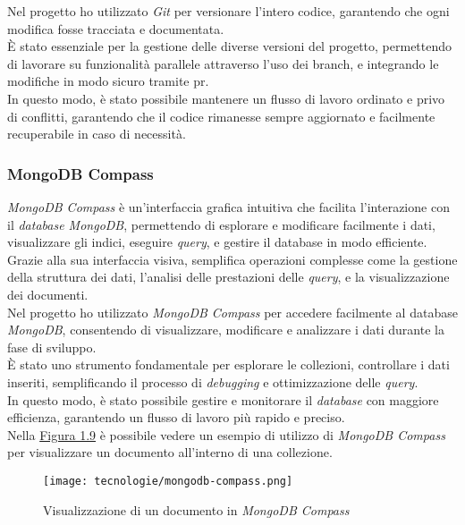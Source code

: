 \noindent Nel progetto ho utilizzato \textit{Git} per versionare l'intero codice, garantendo che ogni modifica fosse tracciata e documentata. \\
È stato essenziale per la gestione delle diverse versioni del progetto, permettendo di lavorare su funzionalità parallele attraverso l'uso dei \gls{branch}, e integrando le modifiche in modo sicuro tramite \gls{pr}. \\
In questo modo, è stato possibile mantenere un flusso di lavoro ordinato e privo di conflitti, garantendo che il codice rimanesse sempre aggiornato e facilmente recuperabile in caso di necessità. 

\subsubsection{MongoDB Compass}

\textit{MongoDB Compass} è un'interfaccia grafica intuitiva che facilita l'interazione con il \textit{database MongoDB}, permettendo di esplorare e modificare facilmente i dati, visualizzare gli indici, eseguire \textit{query}, e gestire il database in modo efficiente.\\
Grazie alla sua interfaccia visiva, semplifica operazioni complesse come la gestione della struttura dei dati, l'analisi delle prestazioni delle \textit{query}, e la visualizzazione dei documenti.\\

\noindent Nel progetto ho utilizzato \textit{MongoDB Compass}  per accedere facilmente al database \textit{MongoDB}, consentendo di visualizzare, modificare e analizzare i dati durante la fase di sviluppo.\\
È stato uno strumento fondamentale per esplorare le collezioni, controllare i dati inseriti, semplificando il processo di \textit{debugging} e ottimizzazione delle \textit{query}.\\
In questo modo, è stato possibile gestire e monitorare il \textit{database} con maggiore efficienza, garantendo un flusso di lavoro più rapido e preciso.\\

\noindent Nella {\hyperref[fig:mongodb-compass]{Figura 1.9}} è possibile vedere un esempio di utilizzo di \textit{MongoDB Compass} per visualizzare un documento all'interno di una collezione.

\begin{figure}[H]
    \label{fig:mongodb-compass}
    \centering
    \texttt{[image: tecnologie/mongodb-compass.png]}
    \caption{Visualizzazione di un documento in \textit{MongoDB Compass}}
\end{figure}
